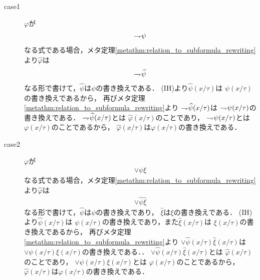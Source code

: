 \begin{metaprf}[第一]
\begin{description}
				\begin{description}
					\item[case1] $\varphi$が
						\begin{align}
							\rightharpoondown\hspace{-0.25em} \psi
						\end{align}
						なる式である場合，メタ定理\ref{metathm:relation_to_subformula_rewriting}より$\widehat{\varphi}$は
						\begin{align}
							\rightharpoondown\hspace{-0.25em} \widehat{\psi}
						\end{align}
						なる形で書けて，$\widehat{\psi}$は$\psi$の書き換えである．
						(IH)より$\widehat{\psi}(x/\tau)$は
						$\psi(x/\tau)$の書き換えであるから，
						再びメタ定理\ref{metathm:relation_to_subformula_rewriting}より
						$\rightharpoondown\hspace{-0.25em} \widehat{\psi}(x/\tau)$は
						$\rightharpoondown\hspace{-0.25em} \psi(x/\tau)$の書き換えである．
						$\rightharpoondown\hspace{-0.25em} \widehat{\psi}(x/\tau)$とは
						$\widehat{\varphi}(x/\tau)$のことであり，
						$\rightharpoondown\hspace{-0.25em} \psi(x/\tau)$とは$\varphi(x/\tau)$のことであるから，
						$\widehat{\varphi}(x/\tau)$は$\varphi(x/\tau)$の書き換えである．
					
					\item[case2] $\varphi$が
						\begin{align}
							\vee \psi \xi
						\end{align}
						なる式である場合，メタ定理\ref{metathm:relation_to_subformula_rewriting}より$\widehat{\varphi}$は
						\begin{align}
							\vee \widehat{\psi} \widehat{\xi}
						\end{align}
						なる形で書けて，$\widehat{\psi}$は$\psi$の書き換えであり，
						$\widehat{\xi}$は$\xi$の書き換えである．
						(IH)より$\widehat{\psi}(x/\tau)$は
						$\psi(x/\tau)$の書き換えであり，また$\widehat{\xi}(x/\tau)$は
						$\xi(x/\tau)$の書き換えであるから，
						再びメタ定理\ref{metathm:relation_to_subformula_rewriting}より
						$\vee \widehat{\psi}(x/\tau)\widehat{\xi}(x/\tau)$は
						$\vee \psi(x/\tau)\xi(x/\tau)$の書き換えである．．
						$\vee \widehat{\psi}(x/\tau)\widehat{\xi}(x/\tau)$とは
						$\widehat{\varphi}(x/\tau)$のことであり，
						$\vee \psi(x/\tau)\xi(x/\tau)$とは
						$\varphi(x/\tau)$のことであるから，
						$\widehat{\varphi}(x/\tau)$は$\varphi(x/\tau)$の書き換えである．
					

\end{description}
\end{description}
\end{metaprf}
